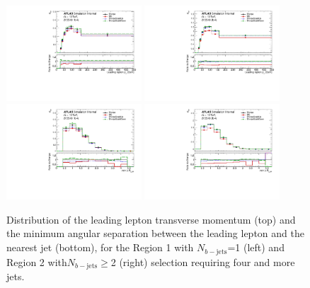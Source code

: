 \begin{figure}[!htb]
\centering
\includegraphics[width=0.45\textwidth]{Plots/ttV/generator/c_Region_0_lep_Pt_0}
\includegraphics[width=0.45\textwidth]{Plots/ttV/generator/c_Region_1_lep_Pt_0}\\
\includegraphics[width=0.45\textwidth]{Plots/ttV/generator/c_Region_0_min_DRl0j}
\includegraphics[width=0.45\textwidth]{Plots/ttV/generator/c_Region_1_min_DRl0j}\\
  \caption{Distribution of the leading lepton transverse momentum (top) and the minimum angular separation between the leading lepton and the nearest jet (bottom), for the Region 1 with $N_{b-\mathrm{jets}}$=1 (left) and Region 2 with$N_{b-\mathrm{jets}}\geq$2 (right) selection requiring four and more jets. 
  \label{ttV:den_lep_kin}}
\end{figure}


